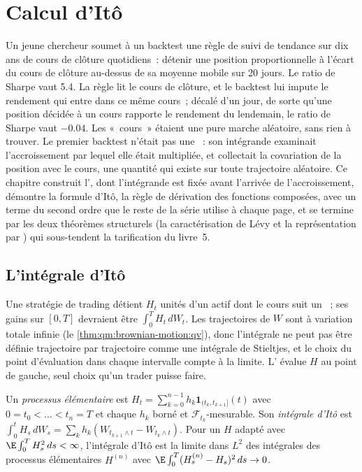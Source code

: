 \chapter{Calcul d'Itô}\label{ch:qm:ito-calculus}

Un jeune chercheur soumet à un backtest une règle de suivi de tendance sur dix ans de cours de clôture quotidiens~: détenir une
position proportionnelle à l'écart du cours de clôture au-dessus de sa moyenne mobile sur 20 jours. Le
ratio de Sharpe vaut 5.4. La règle lit le cours de clôture, et le backtest lui impute le
rendement qui entre dans ce même cours~; décalé d'un jour, de sorte qu'une position décidée à un cours
rapporte le rendement du lendemain, le ratio de Sharpe vaut $-0.04$. Les «~cours~» étaient une pure
marche aléatoire, sans rien à trouver. Le premier backtest n'était pas une ~: son intégrande
examinait l'accroissement par lequel elle était multipliée, et collectait la covariation de la position avec le
cours, une quantité qui existe sur toute trajectoire aléatoire. Ce chapitre construit l',
dont l'intégrande est fixée avant l'arrivée de l'accroissement, démontre la formule d'Itô, la règle de dérivation des fonctions composées,
avec un terme du second ordre que le reste de la série utilise à chaque page, et se termine par les
deux théorèmes structurels (la caractérisation de Lévy et la représentation par ) qui
sous-tendent la tarification du livre~5.

\section{L'intégrale d'Itô}

Une stratégie de trading détient $H_t$ unités d'un actif dont le cours suit un ~; ses
gains sur $[0, T]$ devraient être $\int_0^T H_t\,dW_t$. Les trajectoires de $W$ sont à variation totale infinie
(le \cref{thm:qm:brownian-motion:qv}), donc l'intégrale ne peut pas être définie trajectoire par trajectoire comme une
intégrale de Stieltjes, et le choix du point d'évaluation dans chaque intervalle compte à la limite.
L' évalue $H$ au point de gauche, seul choix qu'un trader puisse faire.

\begin{definition}\label{def:qm:ito-calculus:integral}
Un \emph{processus élémentaire} est $H_t = \sum_{k=0}^{n-1}h_k\mathbf 1_{(t_k,
t_{k+1}]}(t)$ avec $0 = t_0 < \dots < t_n = T$ et chaque $h_k$ borné et $\mathcal
F_{t_k}$-mesurable. Son \emph{intégrale d'Itô} est $\int_0^t H_s\,dW_s = \sum_k
h_k(W_{t_{k+1}\wedge t} - W_{t_k\wedge t})$. Pour un $H$ adapté avec $\E\int_0^T H_s^2\,ds <
\infty$, l'intégrale d'Itô est la limite dans $L^2$ des intégrales des processus élémentaires $H^{(n)}$ avec
$\E\int_0^T(H^{(n)}_s - H_s)^2\,ds \to 0$.
\end{definition}

